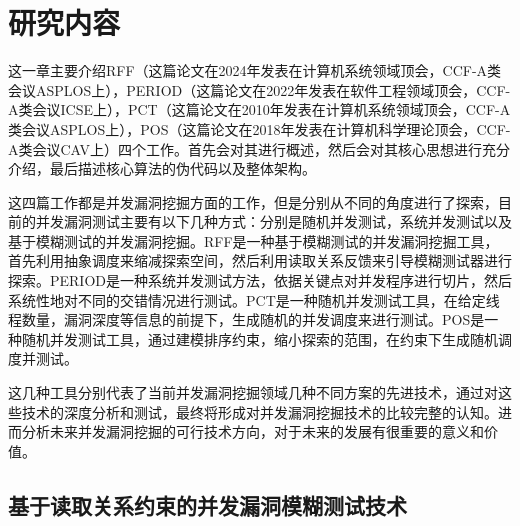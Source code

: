 \clearpage{}

\section{研究内容}
这一章主要介绍RFF\cite{wolff2024greybox}（这篇论文在2024年发表在计算机系统领域顶会，CCF-A类会议ASPLOS上），PERIOD\cite{wen2022controlled}（这篇论文在2022年发表在软件工程领域顶会，CCF-A类会议ICSE上），PCT\cite{burckhardt2010randomized}（这篇论文在2010年发表在计算机系统领域顶会，CCF-A类会议ASPLOS上），POS\cite{yuan2018partial}（这篇论文在2018年发表在计算机科学理论顶会，CCF-A类会议CAV上）四个工作。首先会对其进行概述，然后会对其核心思想进行充分介绍，最后描述核心算法的伪代码以及整体架构。

这四篇工作都是并发漏洞挖掘方面的工作，但是分别从不同的角度进行了探索，目前的并发漏洞测试主要有以下几种方式：分别是随机并发测试，系统并发测试以及基于模糊测试的并发漏洞挖掘。RFF是一种基于模糊测试的并发漏洞挖掘工具，首先利用抽象调度来缩减探索空间，然后利用读取关系反馈来引导模糊测试器进行探索。PERIOD是一种系统并发测试方法，依据关键点对并发程序进行切片，然后系统性地对不同的交错情况进行测试。PCT是一种随机并发测试工具，在给定线程数量，漏洞深度等信息的前提下，生成随机的并发调度来进行测试。POS是一种随机并发测试工具，通过建模排序约束，缩小探索的范围，在约束下生成随机调度并测试。

这几种工具分别代表了当前并发漏洞挖掘领域几种不同方案的先进技术，通过对这些技术的深度分析和测试，最终将形成对并发漏洞挖掘技术的比较完整的认知。进而分析未来并发漏洞挖掘的可行技术方向，对于未来的发展有很重要的意义和价值。



\subsection{基于读取关系约束的并发漏洞模糊测试技术}

